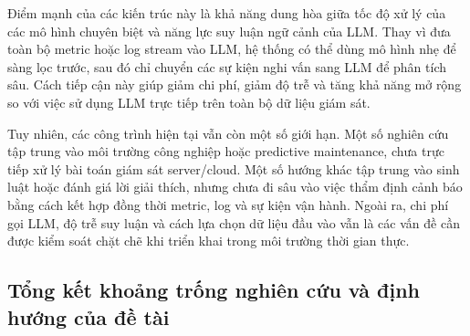 Điểm mạnh của các kiến trúc này là khả năng dung hòa giữa tốc độ xử lý của các mô hình chuyên biệt và năng lực suy luận ngữ cảnh của LLM. Thay vì đưa toàn bộ metric hoặc log stream vào LLM, hệ thống có thể dùng mô hình nhẹ để sàng lọc trước, sau đó chỉ chuyển các sự kiện nghi vấn sang LLM để phân tích sâu. Cách tiếp cận này giúp giảm chi phí, giảm độ trễ và tăng khả năng mở rộng so với việc sử dụng LLM trực tiếp trên toàn bộ dữ liệu giám sát.

Tuy nhiên, các công trình hiện tại vẫn còn một số giới hạn. Một số nghiên cứu tập trung vào môi trường công nghiệp hoặc predictive maintenance, chưa trực tiếp xử lý bài toán giám sát server/cloud. Một số hướng khác tập trung vào sinh luật hoặc đánh giá lời giải thích, nhưng chưa đi sâu vào việc thẩm định cảnh báo bằng cách kết hợp đồng thời metric, log và sự kiện vận hành. Ngoài ra, chi phí gọi LLM, độ trễ suy luận và cách lựa chọn dữ liệu đầu vào vẫn là các vấn đề cần được kiểm soát chặt chẽ khi triển khai trong môi trường thời gian thực.


\subsection{Tổng kết khoảng trống nghiên cứu và định hướng của đề tài}

